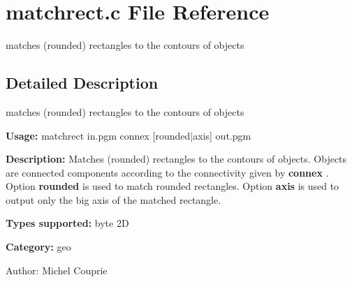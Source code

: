 \section{matchrect.c File Reference}
\label{matchrect_8c}
matches (rounded) rectangles to the contours of objects 



\subsection{Detailed Description}
matches (rounded) rectangles to the contours of objects 

{\bf Usage:} matchrect in.pgm connex [rounded$|$axis] out.pgm

{\bf Description:} Matches (rounded) rectangles to the contours of objects. Objects are connected components according to the connectivity given by {\bf connex} . Option {\bf rounded} is used to match rounded rectangles. Option {\bf axis} is used to output only the big axis of the matched rectangle.

{\bf Types supported:} byte 2D

{\bf Category:} geo

\begin{Desc}
\item[Author:]Michel Couprie \end{Desc}
